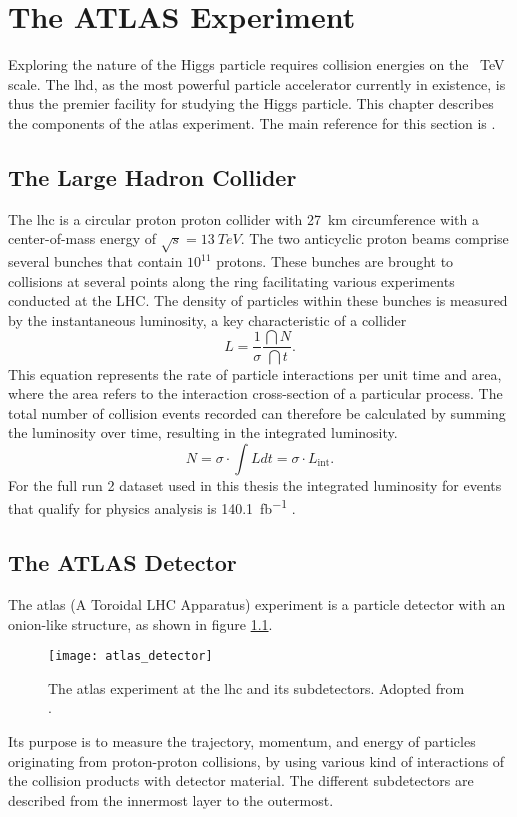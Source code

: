 \chapter{The ATLAS Experiment}\label{sec:atlas}
Exploring the nature of the Higgs particle requires collision energies on the \qty[]{}{TeV} scale. The \ac{lhd}, as the most powerful particle accelerator currently in existence, is thus the premier facility for studying the Higgs particle. This chapter describes the components of the \ac{atlas} experiment. The main reference for this section is \citep{aad2008atlas}.

\section{The Large Hadron Collider}
The \ac{lhc} is a circular proton proton collider with \qty[]{27}{km} circumference with a center-of-mass energy of $\sqrt{s}=\qty[]{13}{TeV}$. The two anticyclic proton beams comprise several bunches that contain $10^{11}$ protons. These bunches are brought to collisions at several points along the ring facilitating various experiments conducted at the LHC. The density of particles within these bunches is measured by the instantaneous luminosity, a key characteristic of a collider
\begin{equation}
    L=\frac{1}{\sigma}\frac{\dint{N}}{\dint{t}}.
\end{equation}
This equation represents the rate of particle interactions per unit time and area, where the area refers to the interaction cross-section of a particular process. The total number of collision events recorded can therefore be calculated by summing the luminosity over time, resulting in the integrated luminosity.
\begin{equation}
    N=\sigma\cdot\int L dt=\sigma\cdot L_\mathrm{int}.
\end{equation}
For the full run 2 dataset used in this thesis the integrated luminosity for events that qualify for physics analysis is \qty[]{140.1}{fb^{-1}} \citep{DAPR-2021-01}.

\section{The ATLAS Detector}
The \ac{atlas} (A Toroidal LHC Apparatus) experiment is a particle detector with an onion-like structure, as shown in figure \ref{fig:atlas_detector}.
\begin{figure}
    \centering
    \texttt{[image: atlas\_detector]}
    \caption[]{The \ac{atlas} experiment at the \ac{lhc} and its subdetectors. Adopted from \citep{Pequenao:1095924}.}
    \label{fig:atlas_detector}
\end{figure}
Its purpose is to measure the trajectory, momentum, and energy of particles originating from proton-proton collisions, by using various kind of interactions of the collision products with detector material. The different subdetectors are described from the innermost layer to the outermost.

